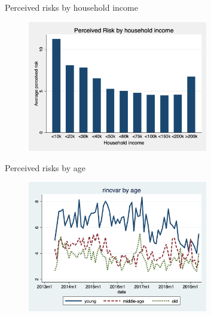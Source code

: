\documentclass{beamer}
\begin{document}
\begin{frame}{Perceived risks by household income}
\begin{figure}
	\centering
	\label{boxplot_hhinc}
	\includegraphics[width=0.7\textwidth]{figures/boxplot_var_HHinc_stata}
\end{figure}
\end{frame}

\begin{frame}{Perceived risks by age}
	\begin{figure}[ht]
		\label{ts_incvar_age_g_mean}
		\centering
		\includegraphics[width=0.7\textwidth]{figures/ts_rincvar_age_g_median.png}
	\end{figure}
\end{frame}
\end{document}
